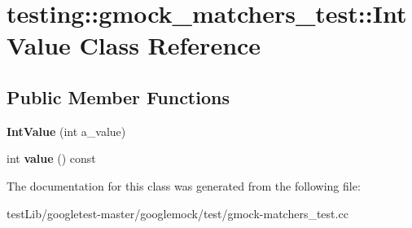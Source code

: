\hypertarget{classtesting_1_1gmock__matchers__test_1_1IntValue}{}\section{testing\+:\+:gmock\+\_\+matchers\+\_\+test\+:\+:Int\+Value Class Reference}
\label{classtesting_1_1gmock__matchers__test_1_1IntValue}
\subsection*{Public Member Functions}
\begin{DoxyCompactItemize}
\item 
\mbox{\label{classtesting_1_1gmock__matchers__test_1_1IntValue_a2a294fcf7ad9f4d9888c4e6194fcd848}} 
{\bfseries Int\+Value} (int a\+\_\+value)
\item 
\mbox{\label{classtesting_1_1gmock__matchers__test_1_1IntValue_a6da000ea8ff787591e07ffaa3c1027d4}} 
int {\bfseries value} () const
\end{DoxyCompactItemize}


The documentation for this class was generated from the following file\+:\begin{DoxyCompactItemize}
\item 
test\+Lib/googletest-\/master/googlemock/test/gmock-\/matchers\+\_\+test.\+cc\end{DoxyCompactItemize}
